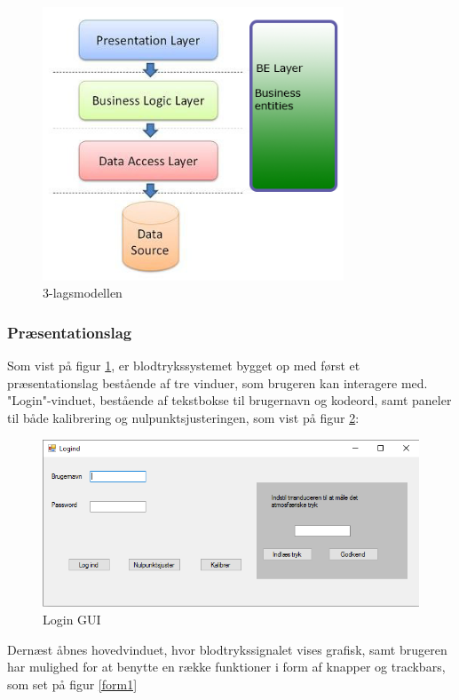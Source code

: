 \begin{figure}[H]
	\centering
	\includegraphics[width=0.8\textwidth]{Figurer/SoftwareImplementering/3lag}
	\caption{3-lagsmodellen}
	\label{3lag}
\end{figure}

\subsubsection{Præsentationslag}\label{praesentationslag}

Som vist på figur \ref{3lag}, er blodtrykssystemet bygget op med først et præsentationslag bestående af tre vinduer, som brugeren kan interagere med.\\
"Login"\--vinduet, bestående af tekstbokse til brugernavn og kodeord, samt paneler til både kalibrering og nulpunktsjusteringen, som vist på figur \ref{LoginGUI}:

\begin{figure}[H]
	\centering
	\includegraphics[width=1\textwidth]{Figurer/SoftwareImplementering/Logind}
	\caption{Login GUI}
	\label{LoginGUI}
\end{figure}
Dernæst åbnes hovedvinduet, hvor blodtrykssignalet vises grafisk, samt brugeren har mulighed for at benytte en række funktioner i form af knapper og trackbars, som set på figur \ref{form1}

